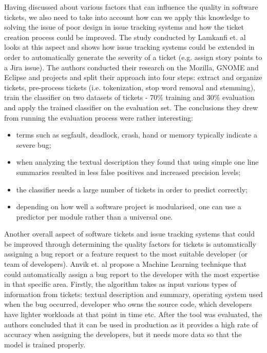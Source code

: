 \documentclass{mpaper}
\begin{document}
Having discussed about various factors that can influence the quality in software tickets, 
we also need to take into account how can we apply this knowledge to solving the issue of 
poor design in issue tracking systems and how the ticket creation process could be improved. 
The study conducted by Lamkanfi et. al \cite{lamkanfi2010predicting} looks at this aspect and
shows how issue tracking systems could be extended in order to automatically generate the severity 
of a ticket (e.g. assign story points to a Jira issue). The authors conducted their research on the Mozilla,
GNOME and Eclipse and projects and split their approach into four steps: extract and organize tickets, 
pre-process tickets (i.e. tokenization, stop word removal and stemming), train the classifier on two datasets 
of tickets - 70\% training and 30\% evaluation and apply the trained classifier on the evaluation set.
The conclusions they drew from running the evaluation process were rather 
interesting:
  \begin{itemize}
    \item terms such as segfault, deadlock, crash, hand or memory typically indicate
      a severe bug;
    \item when analyzing the textual description they found that using simple
      one line summaries resulted in less false positives and increased precision
      levels;
    \item the classifier needs a large number of tickets in order to predict correctly;
    \item depending on how well a software project is modularised, one can 
      use a predictor per module rather than a universal one.
  \end{itemize}

Another overall aspect of software tickets and issue tracking systems that could be improved through 
determining the quality factors for tickets is automatically assigning a bug report or a feature request 
to the most suitable developer (or team of developers). Anvik et. al \cite{anvik2011reducing}
propose a Machine Learning technique that could automatically assign a bug report to the developer 
with the most expertise in that specific area. Firstly, the algorithm takes as input various types of information from 
tickets: textual description and summary, operating system used when the bug occurred, developer 
who owns the source code, which developers have lighter workloads at that point in time etc. After the 
tool was evaluated, the authors concluded that it can be used in production as it provides a high 
rate of accuracy when assigning the developers, but it needs more data so that the model is trained 
properly.
\end{document}
